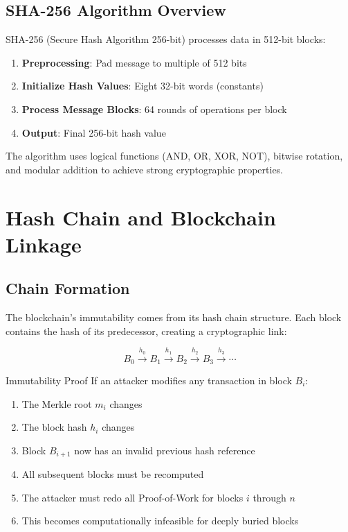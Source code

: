 \documentclass[11pt,a4paper]{article}
\begin{document}
\subsection{SHA-256 Algorithm Overview}

SHA-256 (Secure Hash Algorithm 256-bit) processes data in 512-bit blocks:

\begin{enumerate}
  \item \textbf{Preprocessing}: Pad message to multiple of 512 bits
  \item \textbf{Initialize Hash Values}: Eight 32-bit words (constants)
  \item \textbf{Process Message Blocks}: 64 rounds of operations per block
  \item \textbf{Output}: Final 256-bit hash value
\end{enumerate}

The algorithm uses logical functions (AND, OR, XOR, NOT), bitwise rotation, and modular addition to achieve strong cryptographic properties.

\section{Hash Chain and Blockchain Linkage}

\subsection{Chain Formation}

The blockchain's immutability comes from its hash chain structure. Each block contains the hash of its predecessor, creating a cryptographic link:

\[
B_0 \xrightarrow{h_0} B_1 \xrightarrow{h_1} B_2 \xrightarrow{h_2} B_3 \xrightarrow{h_3} \cdots
\]

\begin{keybox}{Immutability Proof}
If an attacker modifies any transaction in block $B_i$:
\begin{enumerate}
  \item The Merkle root $m_i$ changes
  \item The block hash $h_i$ changes
  \item Block $B_{i+1}$ now has an invalid previous hash reference
  \item All subsequent blocks must be recomputed
  \item The attacker must redo all Proof-of-Work for blocks $i$ through $n$
  \item This becomes computationally infeasible for deeply buried blocks
\end{enumerate}
\end{keybox}
\end{document}
